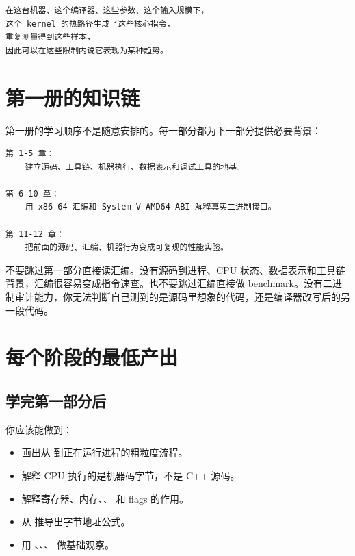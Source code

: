 \begin{center}
\begin{minipage}{0.9\linewidth}
\begin{verbatim}
在这台机器、这个编译器、这些参数、这个输入规模下，
这个 kernel 的热路径生成了这些核心指令，
重复测量得到这些样本，
因此可以在这些限制内说它表现为某种趋势。
\end{verbatim}
\end{minipage}
\end{center}

\section*{第一册的知识链}

第一册的学习顺序不是随意安排的。每一部分都为下一部分提供必要背景：

\begin{center}
\begin{minipage}{0.92\linewidth}
\begin{verbatim}
第 1-5 章：
    建立源码、工具链、机器执行、数据表示和调试工具的地基。

第 6-10 章：
    用 x86-64 汇编和 System V AMD64 ABI 解释真实二进制接口。

第 11-12 章：
    把前面的源码、汇编、机器行为变成可复现的性能实验。
\end{verbatim}
\end{minipage}
\end{center}

不要跳过第一部分直接读汇编。没有源码到进程、CPU 状态、数据表示和工具链背景，汇编很容易变成指令速查。也不要跳过汇编直接做 benchmark。没有二进制审计能力，你无法判断自己测到的是源码里想象的代码，还是编译器改写后的另一段代码。

\section*{每个阶段的最低产出}

\subsection*{学完第一部分后}

你应该能做到：

\begin{itemize}
  \item 画出从  到正在运行进程的粗粒度流程。
  \item 解释 CPU 执行的是机器码字节，不是 C++ 源码。
  \item 解释寄存器、内存、、 和 flags 的作用。
  \item 从  推导出字节地址公式。
  \item 用 、、、 做基础观察。
\end{itemize}


